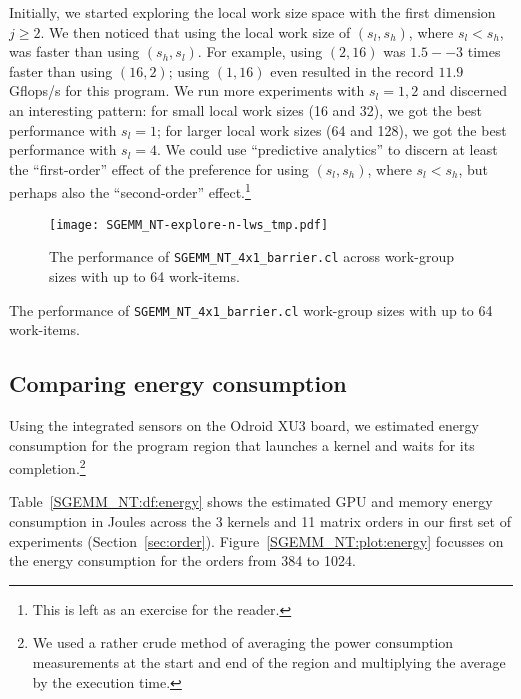 \documentclass{acm_proc_article-sp} %
\begin{document}
Initially, we started exploring the local work size space with the first
dimension $j \ge 2$.
%
We then noticed that using the local work size of $(s_l, s_h)$, where $s_l <
s_h$, was faster than using $(s_h, s_l)$.
%
For example, using $(2, 16)$ was $1.5--3$ times faster than using $(16, 2)$;
using $(1, 16)$ even resulted in the record $11.9$ Gflops/s for this program.
%
We run more experiments with $s_l = 1, 2$ and discerned an interesting pattern:
for small local work sizes (16 and 32), we got the best performance with $s_l =
1$; for larger local work sizes (64 and 128), we got the best performance with
$s_l = 4$.
%
We could use ``predictive analytics'' to discern at least the ``first-order''
effect of the preference for using $(s_l, s_h)$, where $s_l < s_h$, but perhaps
also the ``second-order'' effect.\footnote{This is left as an exercise for the
reader.}

\begin{sidewaysfigure*}
  \texttt{[image: SGEMM\_NT-explore-n-lws\_tmp.pdf]}
  \caption{The performance of {\tt SGEMM\_NT\_4x1\_barrier.cl} across work-group sizes with up to 64 work-items.}
  \label{SGEMM_NT:plot:lws}
\end{sidewaysfigure*}

\begin{table*}
  \centering
  \caption{\label{SGEMM_NT:df:lws}The performance of {\tt SGEMM\_NT\_4x1\_barrier.cl} work-group sizes with up to 64 work-items.}
  
\end{table*}

\subsection{Comparing energy consumption}

Using the integrated sensors on the Odroid XU3 board, we estimated energy
consumption for the program region that launches a kernel and waits for its
completion.\footnote{We used a rather crude method of averaging the power
consumption measurements at the start and end of the region and multiplying the
average by the execution time.}

Table~\ref{SGEMM_NT:df:energy} shows the estimated GPU and memory energy
consumption in Joules across the 3 kernels and 11 matrix orders in our first
set of experiments (Section~\ref{sec:order}).
%
Figure~\ref{SGEMM_NT:plot:energy} focusses on the energy consumption for the
orders from 384 to 1024.
\end{document}

